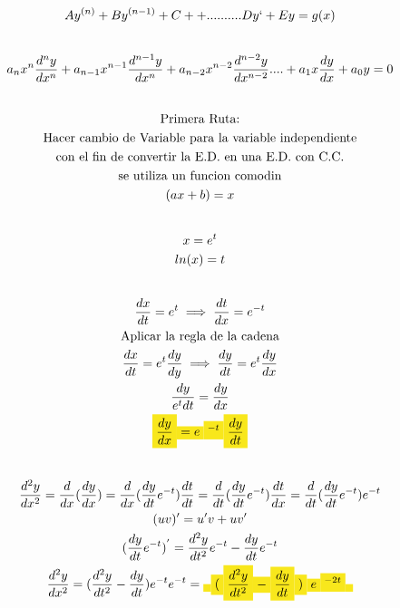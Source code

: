 \documentclass{article}
\begin{document}
\begin{gather*}
Ay^{(n)}+By^{(n-1)}+C++..........Dy`+Ey = g(x) \\
\vspace{0.5em} \\
a_{n}x^{n}\frac{d^{n}y}{dx^{n}}+a_{n-1}x^{n-1}\frac{d^{n-1}y}{dx^{n}} +a_{n-2}x^{n-2}\frac{d^{n-2}y}{dx^{n-2}}....+a_{1}x\frac{dy}{dx} + a_{0}y = 0 \\
\vspace{0.5em} \\
\text{Primera Ruta:} \\
\text{Hacer cambio de Variable para la variable independiente} \\
\text{con el fin de convertir la E.D. en una E.D. con C.C.} \\
\text{se utiliza un funcion comodin} \\
(ax+b)  =x \\
\vspace{0.5em} \\
x = e^{t} \\
ln(x) =t \\
\vspace{0.5em} \\
\frac{dx}{dt} =e^{t} \implies  \frac{dt}{dx} =e^{-t} \\
\text{Aplicar la regla de la cadena} \\
\frac{dx}{dt} =e^{t}\frac{dy}{dy} \implies \frac{dy}{dt} =e^{t}\frac{dy}{dx} \\
\frac{dy}{e^{t}dt} =\frac{dy}{dx} \\
\text{\colorbox[RGB]{248,231,28}{$\frac{dy}{dx}$}}\text{\colorbox[RGB]{248,231,28}{$ = e$}}\text{\colorbox[RGB]{248,231,28}{$^{-t}$}}\text{\colorbox[RGB]{248,231,28}{$\frac{dy}{dt}$}} \\
\vspace{0.5em} \\
\frac{d^{2}y}{dx^{2}} = \frac{d}{dx}(\frac{dy}{dx}) =\frac{d}{dx}(\frac{dy}{dt}e^{-t})\frac{dt}{dt} = \frac{d}{dt}(\frac{dy}{dt}e^{-t})\frac{dt}{dx} = \frac{d}{dt}(\frac{dy}{dt}e^{-t})e^{-t}  \\
(uv)' = u'v+uv' \\
(\frac{dy}{dt}e^{-t})^{'} = \frac{d^{2}y}{dt^{2}}e^{-t} -\frac{dy}{dt}e^{-t} \\
\frac{d^{2}y}{dx^{2}} =(\frac{d^{2}y}{dt^{2}}-\frac{dy}{dt})e^{-t} e^{-t} =\text{\colorbox[RGB]{248,231,28}{$ $}}\text{\colorbox[RGB]{248,231,28}{$($}}\text{\colorbox[RGB]{248,231,28}{$\frac{d^{2}y}{dt^{2}}$}}\text{\colorbox[RGB]{248,231,28}{$-$}}\text{\colorbox[RGB]{248,231,28}{$\frac{dy}{dt}$}}\text{\colorbox[RGB]{248,231,28}{$)$}}\text{\colorbox[RGB]{248,231,28}{$e$}}\text{\colorbox[RGB]{248,231,28}{$^{-2t}$}}\text{\colorbox[RGB]{248,231,28}{$ $}}
\end{gather*}
\end{document}
